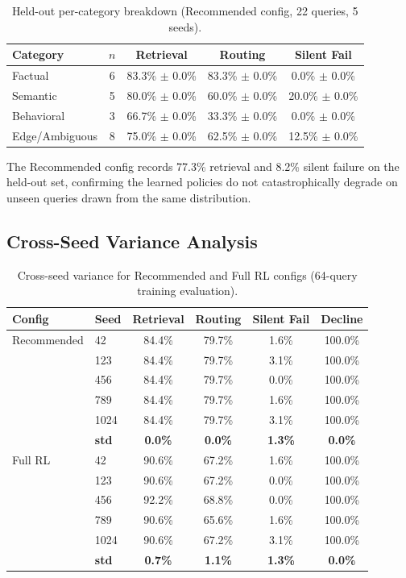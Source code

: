 \documentclass[11pt,letterpaper]{article}
\begin{document}
\begin{table}[H]
\centering
\begin{tabular}{lcccc}
\toprule
\textbf{Category} & $n$ & \textbf{Retrieval} & \textbf{Routing} & \textbf{Silent Fail} \\
\midrule
Factual & 6 & 83.3\% $\pm$ 0.0\% & 83.3\% $\pm$ 0.0\% & 0.0\% $\pm$ 0.0\% \\
Semantic & 5 & 80.0\% $\pm$ 0.0\% & 60.0\% $\pm$ 0.0\% & 20.0\% $\pm$ 0.0\% \\
Behavioral & 3 & 66.7\% $\pm$ 0.0\% & 33.3\% $\pm$ 0.0\% & 0.0\% $\pm$ 0.0\% \\
Edge/Ambiguous & 8 & 75.0\% $\pm$ 0.0\% & 62.5\% $\pm$ 0.0\% & 12.5\% $\pm$ 0.0\% \\
\bottomrule
\end{tabular}
\caption{Held-out per-category breakdown (Recommended config, 22 queries, 5 seeds).}
\label{tab:heldout}
\end{table}

The Recommended config records 77.3\% retrieval and 8.2\% silent failure on the held-out set, confirming the learned policies do not catastrophically degrade on unseen queries drawn from the same distribution.

\subsection{Cross-Seed Variance Analysis}

\begin{table}[H]
\centering
\small
\begin{tabular}{llcccc}
\toprule
\textbf{Config} & \textbf{Seed} & \textbf{Retrieval} & \textbf{Routing} & \textbf{Silent Fail} & \textbf{Decline} \\
\midrule
Recommended & 42 & 84.4\% & 79.7\% & 1.6\% & 100.0\% \\
& 123 & 84.4\% & 79.7\% & 3.1\% & 100.0\% \\
& 456 & 84.4\% & 79.7\% & 0.0\% & 100.0\% \\
& 789 & 84.4\% & 79.7\% & 1.6\% & 100.0\% \\
& 1024 & 84.4\% & 79.7\% & 3.1\% & 100.0\% \\
& \textbf{std} & \textbf{0.0\%} & \textbf{0.0\%} & \textbf{1.3\%} & \textbf{0.0\%} \\
\midrule
Full RL & 42 & 90.6\% & 67.2\% & 1.6\% & 100.0\% \\
& 123 & 90.6\% & 67.2\% & 0.0\% & 100.0\% \\
& 456 & 92.2\% & 68.8\% & 0.0\% & 100.0\% \\
& 789 & 90.6\% & 65.6\% & 1.6\% & 100.0\% \\
& 1024 & 90.6\% & 67.2\% & 3.1\% & 100.0\% \\
& \textbf{std} & \textbf{0.7\%} & \textbf{1.1\%} & \textbf{1.3\%} & \textbf{0.0\%} \\
\bottomrule
\end{tabular}
\caption{Cross-seed variance for Recommended and Full RL configs (64-query training evaluation).}
\label{tab:cross-seed}
\end{table}
\end{document}
